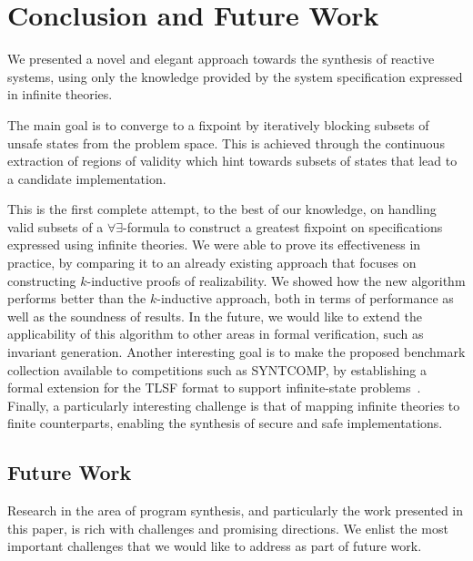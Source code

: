 \section{Conclusion and Future Work}
\label{sec:conclusion}


We presented a novel and elegant approach towards the synthesis
of reactive systems, using only the knowledge provided by the
system specification expressed in infinite theories.
\iffalse
 The approach is
directly inspired from previous work on Property Directed Reachability, with the objective being the construction of inductive
invariants that can be used as a proof to the specification's realizability.
\fi
The main goal is to converge to a fixpoint by iteratively blocking subsets of
unsafe states from the problem space. This is achieved through the continuous
extraction of regions of validity which hint towards subsets of states that
lead to a candidate implementation.

This is the first complete attempt, to the best of our knowledge, on handling
valid subsets of a $\forall\exists$-formula to construct a greatest fixpoint on specifications expressed using infinite theories. We were able to
prove its effectiveness in practice, by comparing it to an already existing
approach that focuses on constructing $k$-inductive proofs of realizability. We showed how the new algorithm performs better than the $k$-inductive approach, both in terms of performance as well as the soundness of results. In the future, we would like to extend the applicability of this algorithm to other areas in formal verification, such as invariant generation. Another interesting goal is to make the proposed benchmark collection available to competitions such as SYNTCOMP, by establishing a formal extension for the TLSF format to support infinite-state problems~\cite{DBLP:journals/corr/Jacobs016}. Finally, a particularly interesting challenge is that of mapping infinite theories to finite counterparts, enabling the synthesis of secure and safe implementations.

\iffalse
\subsection{Future Work}
Research in the area of program synthesis, and particularly the work presented in this paper, is rich with challenges and promising directions. We enlist the most important challenges that we would like to address as part of future work.

